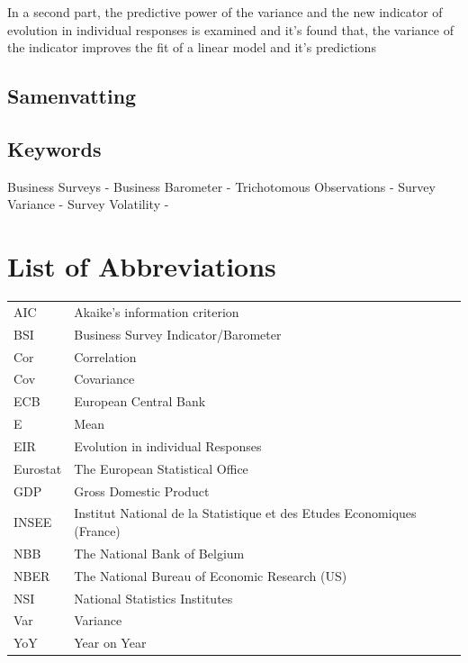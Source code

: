 \documentclass[12pt,a4paper,oneside]{book}
\begin{document}
In a second part, the predictive power of the variance and the new indicator of evolution in individual responses is examined and it's found that, the variance of the indicator improves the fit of a linear model and it's predictions


\section*{Samenvatting}


\section*{Keywords}
Business Surveys - 
Business Barometer -
Trichotomous Observations -
Survey Variance - 
Survey Volatility -



\chapter*{List of Abbreviations}

\begin{tabular}{l l}
  AIC       & Akaike's information criterion \\
  BSI       & Business Survey Indicator/Barometer \\
  Cor       & Correlation \\
  Cov       & Covariance \\
  ECB       & European Central Bank \\
  E         & Mean \\
  EIR       & Evolution in individual Responses \\
  Eurostat  & The European Statistical Office \\
  GDP       & Gross Domestic Product \\
  INSEE     & Institut National de la Statistique et des Etudes Economiques (France) \\
  NBB       & The National Bank of Belgium \\
  NBER      & The National Bureau of Economic Research (US) \\
  NSI       & National Statistics Institutes \\
  Var       & Variance \\
  YoY       & Year on Year \\
\end{tabular}

\tableofcontents

\newpage
\setcounter{page}{0}
\end{document}
